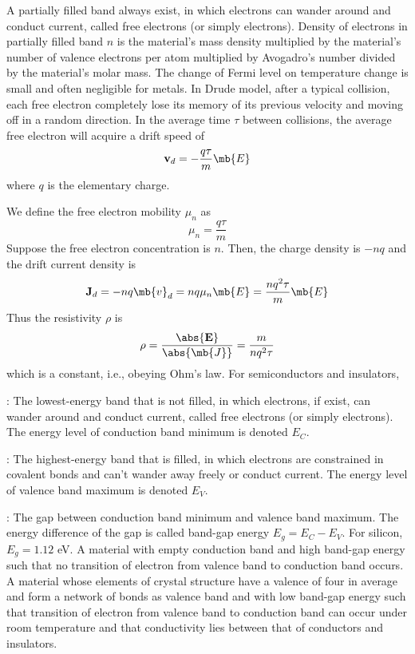 \documentclass[a4paper,12pt]{article}
\begin{document}
A partially filled band always exist, in which electrons can wander around and conduct current, called free electrons (or simply electrons).
Density of electrons in partially filled band $n$ is the material's mass density multiplied by the material's number of valence electrons per atom multiplied by Avogadro's number divided by the material's molar mass.
The change of Fermi level on temperature change is small and often negligible for metals.
In Drude model, after a typical collision, each free electron completely lose its memory of its previous velocity and moving off in a random direction. In the average time $\tau$ between collisions, the average free electron will acquire a drift speed of
\[\mathbf{v}_d=-\frac{q\tau}{m}\mb{E}\]
where $q$ is the elementary charge.

We define the free electron mobility $\mu_n$ as
\[\mu_n=\frac{q\tau}{m}\]
Suppose the free electron concentration is $n$. Then, the charge density is $-nq$ and the drift current density is
\[\mathbf{J}_d=-nq\mb{v}_d=nq\mu_n\mb{E}=\frac{nq^2\tau}{m}\mb{E}\]
Thus the resistivity $\rho$ is
\[\rho=\frac{\abs{\mathbf{E}}}{\abs{\mb{J}}}=\frac{m}{nq^2\tau}\]
which is a constant, i.e., obeying Ohm's law.
For semiconductors and insulators,
\bit
\item{}: The lowest-energy band that is not filled, in which electrons, if exist, can wander around and conduct current, called free electrons (or simply electrons). The energy level of conduction band minimum is denoted $E_C$.
\item{}: The highest-energy band that is filled, in which electrons are constrained in covalent bonds and can't wander away freely or conduct current. The energy level of valence band maximum is denoted $E_V$.
\item{}: The gap between conduction band minimum and valence band maximum. The energy difference of the gap is called band-gap energy $E_g=E_C-E_V$. For silicon, $E_g=1.12$ eV.
\eit
{}
A material with empty conduction band and high band-gap energy such that no transition of electron from valence band to conduction band occurs.
A material whose elements of crystal structure have a valence of four in average and form a network of bonds as valence band and with low band-gap energy such that transition of electron from valence band to conduction band can occur under room temperature and that conductivity lies between that of conductors and insulators.
\end{document}
